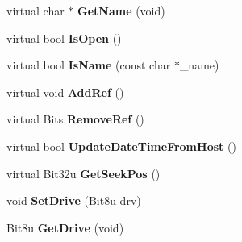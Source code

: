\begin{DoxyCompactItemize}
\item 
\hypertarget{classDOS__File_abb4d2689b5d03d77421389629db0e1fb}{virtual char $\ast$ {\bfseries Get\-Name} (void)}\label{classDOS__File_abb4d2689b5d03d77421389629db0e1fb}

\item 
\hypertarget{classDOS__File_aa69aac124647f1ee095f165ce2bbee5b}{virtual bool {\bfseries Is\-Open} ()}\label{classDOS__File_aa69aac124647f1ee095f165ce2bbee5b}

\item 
\hypertarget{classDOS__File_ac072a4f064cb40e53291e8b7ef65c628}{virtual bool {\bfseries Is\-Name} (const char $\ast$\-\_\-name)}\label{classDOS__File_ac072a4f064cb40e53291e8b7ef65c628}

\item 
\hypertarget{classDOS__File_af518157a13945e5c73e0152add3490c8}{virtual void {\bfseries Add\-Ref} ()}\label{classDOS__File_af518157a13945e5c73e0152add3490c8}

\item 
\hypertarget{classDOS__File_a435afa3450fd4c75665f8a13ff03fb9d}{virtual Bits {\bfseries Remove\-Ref} ()}\label{classDOS__File_a435afa3450fd4c75665f8a13ff03fb9d}

\item 
\hypertarget{classDOS__File_a3e45ea4f759d34abfb4f696ee9225fae}{virtual bool {\bfseries Update\-Date\-Time\-From\-Host} ()}\label{classDOS__File_a3e45ea4f759d34abfb4f696ee9225fae}

\item 
\hypertarget{classDOS__File_a9473cbf5f0b6b3fabeeaf4c7c98f9cec}{virtual Bit32u {\bfseries Get\-Seek\-Pos} ()}\label{classDOS__File_a9473cbf5f0b6b3fabeeaf4c7c98f9cec}

\item 
\hypertarget{classDOS__File_a1874a25ea3a55075fc87c324a0f4d9b9}{void {\bfseries Set\-Drive} (Bit8u drv)}\label{classDOS__File_a1874a25ea3a55075fc87c324a0f4d9b9}

\item 
\hypertarget{classDOS__File_af4d98d880115f37ba0b3ff6e95bbaf55}{Bit8u {\bfseries Get\-Drive} (void)}\label{classDOS__File_af4d98d880115f37ba0b3ff6e95bbaf55}

\end{DoxyCompactItemize}
